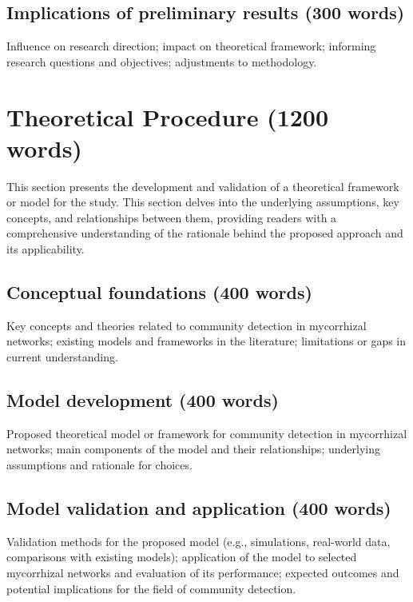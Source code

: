 \documentclass[journal,article,submit,pdftex,moreauthors]{Definitions/mdpi}
\begin{document}
\subsection{Implications of preliminary results (300 words)} Influence on research direction; impact on theoretical framework; informing research questions and objectives; adjustments to methodology.


%
%

\section{Theoretical Procedure (1200 words)}\label{sec:3}
This section presents the development and validation of a theoretical framework or model for the study. This section delves into the underlying assumptions, key concepts, and relationships between them, providing readers with a comprehensive understanding of the rationale behind the proposed approach and its applicability.

\subsection{Conceptual foundations (400 words)}
Key concepts and theories related to community detection in mycorrhizal networks; existing models and frameworks in the literature; limitations or gaps in current understanding.

\subsection{Model development (400 words)}
Proposed theoretical model or framework for community detection in mycorrhizal networks; main components of the model and their relationships; underlying assumptions and rationale for choices.

\subsection{Model validation and application (400 words)}
Validation methods for the proposed model (e.g., simulations, real-world data, comparisons with existing models); application of the model to selected mycorrhizal networks and evaluation of its performance; expected outcomes and potential implications for the field of community detection.
\end{document}
